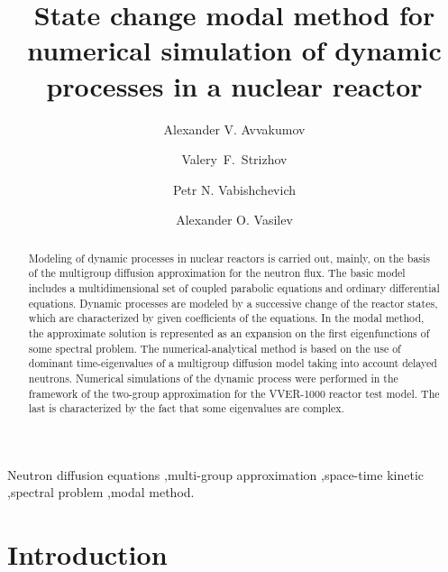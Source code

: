 \documentclass[authoryear]{elsarticle}
\begin{document}
\begin{frontmatter}

\title{State change modal method for numerical simulation of dynamic processes in a nuclear reactor}

\author[ki]{Alexander V. Avvakumov}

\author[nsi]{Valery~F.~Strizhov}

\author[nsi,univ]{Petr N. Vabishchevich}

\author[univ]{Alexander O. Vasilev}

\address[ki]{National Research Center \emph{Kurchatov Institute},  1, Sq. Academician Kurchatov, Moscow, Russia}
\address[nsi]{Nuclear Safety Institute, Russian Academy of Sciences, 52, B. Tulskaya, Moscow, Russia}
\address[univ]{North-Eastern Federal University, 58, Belinskogo, Yakutsk, Russia}


\begin{abstract}
Modeling of dynamic processes in nuclear reactors is carried out, mainly, on the basis of the multigroup diffusion approximation for the neutron flux. The basic model includes a multidimensional set of coupled parabolic equations and ordinary differential equations. Dynamic processes are modeled by a successive change of the reactor states, which are characterized by given coefficients of the equations. In the modal method, the approximate solution is represented as an expansion on the first eigenfunctions of some spectral problem. The numerical-analytical method is based on the use of dominant time-eigenvalues of a multigroup diffusion model taking into account delayed neutrons. Numerical simulations of the dynamic process were performed in the framework of the two-group approximation for the VVER-1000 reactor test model. The last is characterized by the fact that some eigenvalues are complex.
\end{abstract}

\begin{keyword}
Neutron diffusion equations \sep  multi-group approximation \sep space-time kinetic 
\sep spectral problem \sep modal method.

\end{keyword}

\end{frontmatter}


\section{Introduction} 
\end{document}
